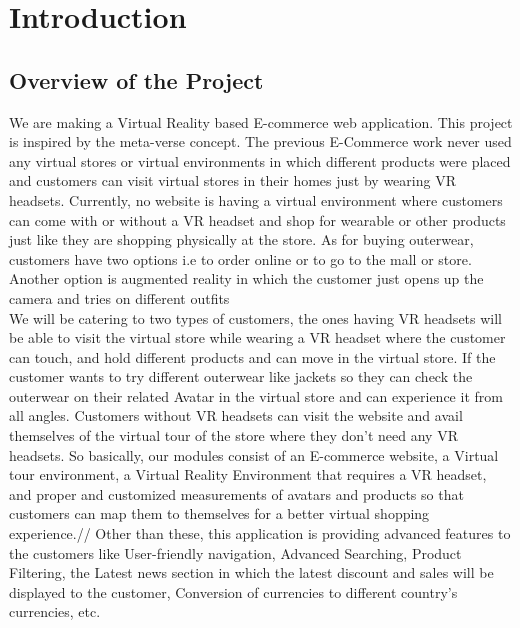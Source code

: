

\begingroup%
\makeatletter%
\let\clearpage\relax%
\vspace*{\fill}%
\vspace*{\dimexpr-50\p@-\baselineskip}%
\chapterfont{\centering}
\chapter{Introduction}
\vspace*{\fill}%
\endgroup


\newpage
\label{Chapter1}

\section{Overview of the Project}
\justifying
We are making a Virtual Reality based E-commerce web application. This project is inspired by the meta-verse concept. The previous E-Commerce work never used any virtual stores or virtual environments in which different products were placed and customers can visit virtual stores in their homes just by wearing VR headsets. Currently, no website is having a virtual environment where customers can come with or without a VR headset and shop for wearable or other products just like they are shopping physically at the store. As for buying outerwear, customers have two options i.e to order online or to go to the mall or store. Another option is augmented reality in which the customer just opens up the camera and tries on different outfits \\ We will be catering to two types of customers, the ones having VR headsets will be able to visit the virtual store while wearing a VR headset where the customer can touch, and hold different products and can move in the virtual store. If the customer wants to try different outerwear like jackets so they can check the outerwear on their related Avatar in the virtual store and can experience it from all angles. Customers without VR headsets can visit the website and avail themselves of the virtual tour of the store where they don’t need any VR headsets. So basically, our modules consist of an E-commerce website, a Virtual tour environment, a Virtual Reality Environment that requires a VR headset, and proper and customized measurements of avatars and products so that customers can map them to themselves for a better virtual shopping experience.// Other than these, this application is providing advanced features to the customers like User-friendly navigation, Advanced Searching, Product Filtering, the Latest news section in which the latest discount and sales will be displayed to the customer, Conversion of currencies to different country’s currencies, etc.\\
